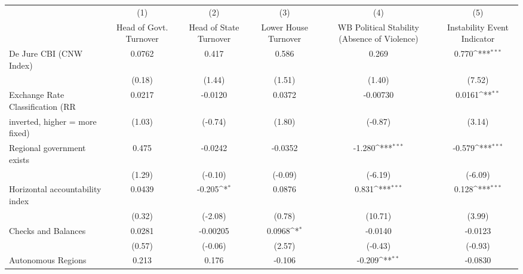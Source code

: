 {
\def\sym#1{\ifmmode^{#1}\else\(^{#1}\)\fi}
\begin{tabular}{l*{5}{c}}
\toprule
                                        &\multicolumn{1}{c}{(1)}&\multicolumn{1}{c}{(2)}&\multicolumn{1}{c}{(3)}&\multicolumn{1}{c}{(4)}&\multicolumn{1}{c}{(5)}\\
                                        &\multicolumn{1}{c}{Head of Govt. Turnover}&\multicolumn{1}{c}{Head of State Turnover}&\multicolumn{1}{c}{Lower House Turnover}&\multicolumn{1}{c}{WB Political Stability (Absence of Violence)}&\multicolumn{1}{c}{Instability Event Indicator}\\
\midrule
De Jure CBI (CNW Index)                 &    0.0762         &     0.417         &     0.586         &     0.269         &     0.770\sym{***}\\
                                        &    (0.18)         &    (1.44)         &    (1.51)         &    (1.40)         &    (7.52)         \\
\addlinespace
Exchange Rate Classification (RR        &    0.0217         &   -0.0120         &    0.0372         &  -0.00730         &    0.0161\sym{**} \\
inverted, higher = more fixed)          &    (1.03)         &   (-0.74)         &    (1.80)         &   (-0.87)         &    (3.14)         \\
\addlinespace
Regional government exists              &     0.475         &   -0.0242         &   -0.0352         &    -1.280\sym{***}&    -0.579\sym{***}\\
                                        &    (1.29)         &   (-0.10)         &   (-0.09)         &   (-6.19)         &   (-6.09)         \\
\addlinespace
Horizontal accountability index         &    0.0439         &    -0.205\sym{*}  &    0.0876         &     0.831\sym{***}&     0.128\sym{***}\\
                                        &    (0.32)         &   (-2.08)         &    (0.78)         &   (10.71)         &    (3.99)         \\
\addlinespace
Checks and Balances                     &    0.0281         &  -0.00205         &    0.0968\sym{*}  &   -0.0140         &   -0.0123         \\
                                        &    (0.57)         &   (-0.06)         &    (2.57)         &   (-0.43)         &   (-0.93)         \\
\addlinespace
Autonomous Regions                      &     0.213         &     0.176         &    -0.106         &    -0.209\sym{**} &   -0.0830         \\

\end{tabular}}
